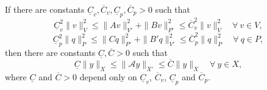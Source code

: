 \begin{theorem}
If there are constants $\underline{C}_v, \overline{C}_v, \underline{C}_p, \overline{C}_p>0$ such that
\begin{equation*}
\underline{C}_v^2\|v\|_V^2\leq \|Av\|_{V'}^2 + \|Bv\|_{P'}^2 \leq \overline{C}_v^2\|v\|_V^2\quad \forall~v\in V,
\end{equation*}
\begin{equation*}
\underline{C}_p^2\|q\|_P^2\leq \|Cq\|_{P'}^2 + \|B'q\|_{V'}^2 \leq \overline{C}_p^2\|q\|_P^2\quad \forall~q\in P,
\end{equation*}
then there are constants $\underline{C}, \overline{C}>0$ such that
\[
\underline{C}\|y\|_X\leq\|\mathcal A y\|_{X'}\leq \overline{C}\|y\|_X \quad \forall~y\in X,
\]
where $\underline{C}$ and $\overline{C}>0$ depend only on $\underline{C}_v$, $\overline{C}_v$, $\underline{C}_p$ and $\overline{C}_p$.
\end{theorem}
